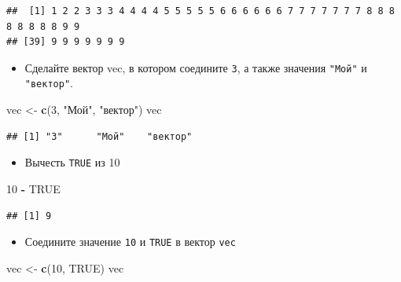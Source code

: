 \documentclass[]{book}
\newenvironment{Shaded}{\begin{snugshade}}{\end{snugshade}}
\newcommand{\KeywordTok}[1]{\textcolor[rgb]{0.13,0.29,0.53}{\textbf{#1}}}
\newcommand{\DecValTok}[1]{\textcolor[rgb]{0.00,0.00,0.81}{#1}}
\newcommand{\StringTok}[1]{\textcolor[rgb]{0.31,0.60,0.02}{#1}}
\newcommand{\OtherTok}[1]{\textcolor[rgb]{0.56,0.35,0.01}{#1}}
\newcommand{\OperatorTok}[1]{\textcolor[rgb]{0.81,0.36,0.00}{\textbf{#1}}}
\newcommand{\NormalTok}[1]{#1}
\providecommand{\tightlist}{%
  \setlength{\itemsep}{0pt}\setlength{\parskip}{0pt}}
\begin{document}
\begin{verbatim}
##  [1] 1 2 2 3 3 3 4 4 4 4 5 5 5 5 5 6 6 6 6 6 6 7 7 7 7 7 7 7 8 8 8 8 8 8 8 8 9 9
## [39] 9 9 9 9 9 9 9
\end{verbatim}

\begin{itemize}
\tightlist
\item
  Сделайте вектор vec, в котором соедините \texttt{3}, а также значения
  \texttt{"Мой"} и \texttt{"вектор"}.
\end{itemize}

\begin{Shaded}
\begin{Highlighting}[]
\NormalTok{vec <-}\StringTok{ }\KeywordTok{c}\NormalTok{(}\DecValTok{3}\NormalTok{, }\StringTok{"Мой"}\NormalTok{, }\StringTok{"вектор"}\NormalTok{)}
\NormalTok{vec}
\end{Highlighting}
\end{Shaded}

\begin{verbatim}
## [1] "3"      "Мой"    "вектор"
\end{verbatim}

\begin{itemize}
\tightlist
\item
  Вычесть \texttt{TRUE} из 10
\end{itemize}

\begin{Shaded}
\begin{Highlighting}[]
\DecValTok{10} \OperatorTok{-}\StringTok{ }\OtherTok{TRUE}
\end{Highlighting}
\end{Shaded}

\begin{verbatim}
## [1] 9
\end{verbatim}

\begin{itemize}
\tightlist
\item
  Соедините значение \texttt{10} и \texttt{TRUE} в вектор \texttt{vec}
\end{itemize}

\begin{Shaded}
\begin{Highlighting}[]
\NormalTok{vec <-}\StringTok{ }\KeywordTok{c}\NormalTok{(}\DecValTok{10}\NormalTok{, }\OtherTok{TRUE}\NormalTok{)}
\NormalTok{vec}
\end{Highlighting}
\end{Shaded}
\end{document}
